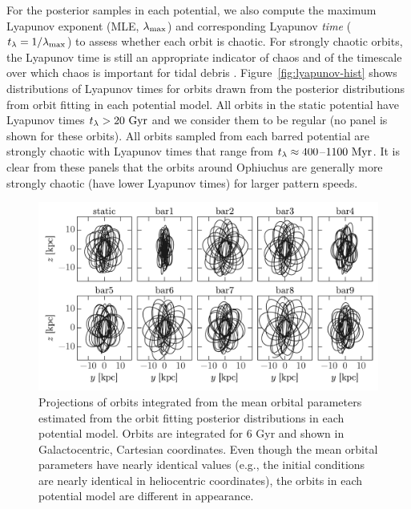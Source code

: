 For the posterior samples in each potential, we also compute the maximum Lyapunov exponent (MLE, $\lambda_{\rm max}$) and corresponding Lyapunov \emph{time} ($t_\lambda = 1/\lambda_{\rm max}$) to assess whether each orbit is chaotic. For strongly chaotic orbits, the Lyapunov time is still an appropriate indicator of chaos and of the timescale over which chaos is important for tidal debris \citep{apw15-chaos}. Figure~\ref{fig:lyapunov-hist} shows distributions of Lyapunov times for orbits drawn from the posterior distributions from orbit fitting in each potential model. All orbits in the static potential have Lyapunov times $t_\lambda > 20~{\rm Gyr}$ and we consider them to be regular (no panel is shown for these orbits). All orbits sampled from each barred potential are strongly chaotic with Lyapunov times that range from $t_\lambda \approx 400$--$1100~{\rm Myr}$. It is clear from these panels that the orbits around Ophiuchus are generally more strongly chaotic (have lower Lyapunov times) for larger pattern speeds. 

\begin{figure}[!tbp]
\begin{center}
\includegraphics[width=\textwidth]{figures/ch4/orbit-yz}
\caption{  Projections of orbits integrated from the mean orbital parameters estimated from the orbit fitting posterior distributions in each potential model. Orbits are integrated for 6 Gyr and shown in Galactocentric, Cartesian coordinates. Even though the mean orbital parameters have nearly identical values (e.g., the initial conditions are nearly identical in heliocentric coordinates), the orbits in each potential model are  different in appearance. }
\label{fig:orbits-yz}
\end{center}
\end{figure}

